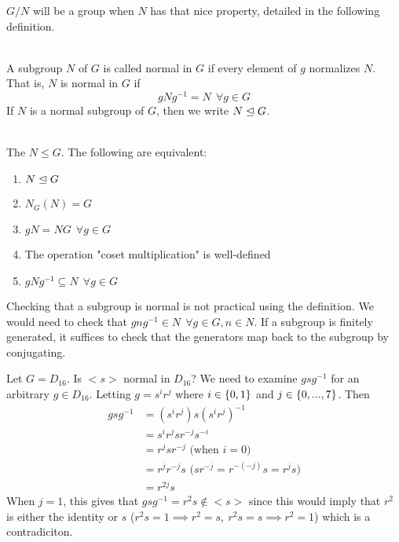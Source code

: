 $G/N$ will be a group when $N$ has that nice property, detailed in the following definition.

\begin{definition} \leavevmode \\
    A subgroup $N$ of $G$ is called normal in $G$ if every element of $g$ normalizes $N$. That is, $N$ is normal in $G$ if 
    $$gNg^{-1} = N ~~\forall g \in G$$
    If $N$ is a normal subgroup of $G$, then we write $N \trianglelefteq G$.
\end{definition}

\begin{theorem} \leavevmode \\
    \label{thm6}
    The $N \leq G$. The following are equivalent:
    \begin{enumerate}
        \item $N \trianglelefteq G$
        \item $N_G(N) = G$
        \item $gN = NG ~~\forall g \in G$
        \item The operation "coset multiplication" is well-defined 
        \item $gNg^{-1} \subseteq N ~~\forall g \in G$
    \end{enumerate}
\end{theorem}

\begin{example}
    Checking that a subgroup is normal is not practical using the definition. We would need to check that $gng^{-1} \in N ~~\forall g \in G, n \in N$. If a subgroup is finitely generated, it suffices to check that the generators map back to the subgroup by conjugating.

    Let $G = D_{16}$. Is $<s>$ normal in $D_{16}$? We need to examine $gsg^{-1}$ for an arbitrary $g \in D_{16}$. Letting $g = s^ir^j$ where $i \in \left\{0,1\right\}$ and $j \in \left\{0, ..., 7\right\}$. Then 
    \begin{align*}
        gsg^{-1} &= (s^ir^j)s(s^ir^j)^{-1} \\
        &= s^ir^jsr^{-j}s^{-i} \\
        &= r^jsr^{-j} \text{  (when $i=0$)}\\
        &= r^jr^{-j}s \text{  ($sr^{-j} = r^{-(-j)}s = r^js$)} \\
        &= r^{2j}s
    \end{align*}
    When $j=1$, this gives that $gsg^{-1} = r^2s \not \in <s>$ since this would imply that $r^2$ is either the identity or $s$ ($r^2s = 1\implies r^2 = s, ~r^2s =s \implies r^2 = 1$) which is a contradiciton.
\end{example}

